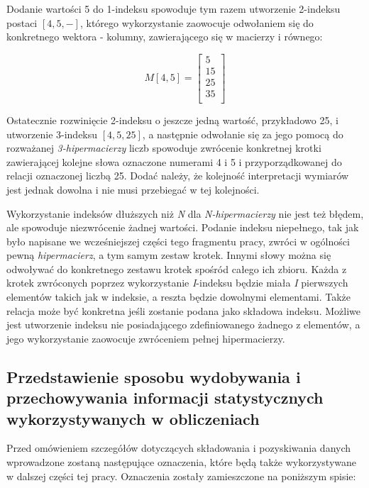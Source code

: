 Dodanie wartości 5 do 1-indeksu spowoduje tym razem utworzenie 2-indeksu postaci \( [4, 5, -] \), którego wykorzystanie zaowocuje odwołaniem się do konkretnego wektora - kolumny, zawierającego się w macierzy i równego:

\[
M[4, 5] = 
\left[
\begin{array}{c}
5 \\
15 \\
25 \\
35 \\
\end{array}
\right]
\]

Ostatecznie rozwinięcie 2-indeksu o jeszcze jedną wartość, przykładowo 25, i utworzenie 3-indeksu \( [4, 5, 25] \), a następnie odwołanie się za jego pomocą do rozważanej \emph{3-hipermacierzy} liczb spowoduje zwrócenie konkretnej krotki zawierającej kolejne słowa oznaczone numerami 4 i 5 i przyporządkowanej do relacji oznaczonej liczbą 25.
Dodać należy, że kolejność interpretacji wymiarów jest jednak dowolna i nie musi przebiegać w tej kolejności.

\par
Wykorzystanie indeksów dłuższych niż \emph{N} dla \emph{N-hipermacierzy} nie jest też błędem, ale spowoduje niezwrócenie żadnej wartości.
Podanie indeksu niepełnego, tak jak było napisane we wcześniejszej części tego fragmentu pracy, zwróci w ogólności pewną \emph{hipermacierz}, a tym samym zestaw krotek.
Innymi słowy można się odwoływać do konkretnego zestawu krotek spośród całego ich zbioru. 
Każda z krotek zwróconych poprzez wykorzystanie \emph{I}-indeksu będzie miała \emph{I} pierwszych elementów takich jak w indeksie, a reszta będzie dowolnymi elementami.
Także relacja może być konkretna jeśli zostanie podana jako składowa indeksu.
Możliwe jest utworzenie indeksu nie posiadającego zdefiniowanego żadnego z elementów, a jego wykorzystanie zaowocuje zwróceniem pełnej hipermacierzy.


\subsection{Przedstawienie sposobu wydobywania i przechowywania informacji statystycznych wykorzystywanych w obliczeniach}
Przed omówieniem szczegółów dotyczących składowania i pozyskiwania danych wprowadzone zostaną następujące oznaczenia, które będą także wykorzystywane w dalszej części tej pracy.
Oznaczenia zostały zamieszczone na poniższym spisie:

